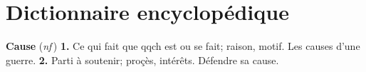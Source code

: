 
\section{Dictionnaire encyclopédique}

{\bf Cause} ({\it nf}\,) {\bf 1.} Ce qui fait que qqch est ou se fait; raison, motif. Les causes d'une guerre. {\bf 2.} Parti à soutenir; proçès, intérêts. Défendre sa cause.

